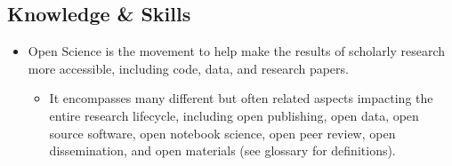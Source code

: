 \documentclass{article}
\begin{document}
\subsection{Knowledge \& Skills}\label{knowledge--skills}


\begin{itemize}
\item Open Science is the movement to help make the results of scholarly research more accessible, including code, data, and research papers.

\begin{itemize}
\item It encompasses many different but often related aspects impacting the entire research lifecycle, including open publishing, open data, open source software, open notebook science, open peer review, open dissemination, and open materials (see glossary for definitions).


\end{itemize}

\end{itemize}
\end{document}
